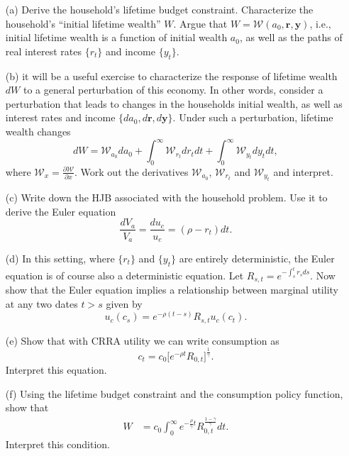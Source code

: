 \documentclass[11pt]{extarticle}
\theoremstyle{plain}
\theoremstyle{definition}
\begin{document}
\begin{enumerate}
\item [(a)] Derive the household's lifetime budget constraint. Characterize the household's ``initial lifetime wealth'' $W$. Argue that $W = \mathcal W(a_0, \bm{r}, \bm{y})$, i.e., initial lifetime wealth is a function of initial wealth $a_0$, as well as the paths of real interest rates $\{r_t\}$ and income $\{y_t\}$. 


\item [(b)] it will be a useful exercise to characterize the response of lifetime wealth $dW$ to a general perturbation of this economy. In other words, consider a perturbation that leads to changes in the households initial wealth, as well as interest rates and income $\{da_0, d \bm r, d \bm y\}$. Under such a perturbation, lifetime wealth changes 
\begin{equation*}
	dW = \mathcal W_{a_0} da_0 + \int_0^\infty \mathcal W_{r_t} d r_t dt + \int_0^\infty \mathcal W_{y_t} d y_t dt, 
\end{equation*}
where $\mathcal W_x = \frac{\partial \mathcal W}{\partial x}$. Work out the derivatives $\mathcal W_{a_0}$, $\mathcal W_{r_t}$ and $\mathcal W_{y_t}$ and interpret.

\item [(c)] Write down the HJB associated with the household problem. Use it to derive the Euler equation
\begin{equation*}
	\frac{dV_a}{V_a} = \frac{du_c}{u_c} =  (\rho - r_t) dt. 
\end{equation*}

\item [(d)] In this setting, where $\{r_t\}$ and $\{y_t\}$ are entirely deterministic, the Euler equation is of course also a deterministic equation. Let $R_{s,t} = e^{-\int_s^t r_s ds}$. Now show that the Euler equation implies a relationship between marginal utility at any two dates $t > s$ given by
\begin{equation*}
	u_c(c_s) = e^{- \rho (t-s)} R_{s,t} u_c(c_t). 
\end{equation*}

\item [(e)] Show that with CRRA utility we can write consumption as 
\begin{equation*}
	c_t = c_0 \bigg[ e^{- \rho t} R_{0,t} \bigg]^\frac{1}{\gamma} .
\end{equation*}
Interpret this equation. 

\item [(f)] Using the lifetime budget constraint and the consumption policy function, show that 
\begin{align*}
	W &= c_0 \int_0^\infty e^{- \frac{\rho}{\gamma} t} R_{0,t}^\frac{1-\gamma}{\gamma} dt.
\end{align*}
Interpret this condition. 


\end{enumerate}
\end{document}
